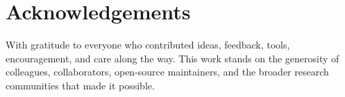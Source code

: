 \section*{Acknowledgements}

With gratitude to everyone who contributed ideas, feedback, tools,
encouragement, and care along the way. This work stands on the generosity
of colleagues, collaborators, open-source maintainers, and the broader
research communities that made it possible.
